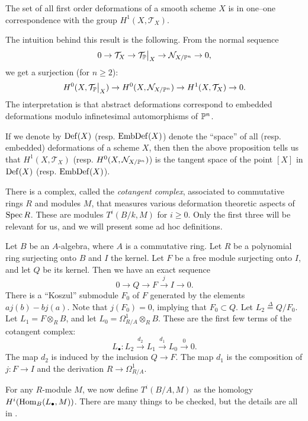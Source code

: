 \begin{proposition}
The set of all first order deformations of a smooth scheme $X$ is in one--one correspondence with the group $H^1(X,\mathcal T_X)$.
\end{proposition}

\begin{remark}
The intuition behind this result is the following. From the normal sequence
\[
0 \to \mathcal T_X \to \restr{\mathcal T_\P}{X} \to \mathcal N_{X/\P^n} \to 0,
\]
we get a surjection (for $n \geq 2$):
\[
H^0(X, \restr{\mathcal T_\P}{X}) \to H^0(X,\mathcal N_{X/\P^n}) \to H^1(X,\mathcal T_X) \to 0.
\]
The interpretation is that abstract deformations correspond to embedded deformations modulo infinetesimal automorphisms of $\P^n$.
\end{remark}

If we denote by $\Def(X)$  (resp. $\EmbDef(X)$) denote the ``space'' of all (resp. embedded) deformations of a scheme $X$, then then the above proposition tells us that $H^1(X,\mathcal T_X)$ (resp. $H^0(X,\mathcal N_{X/\P^n})$) is the tangent space of the point $[X]$ in $\Def(X)$ (resp. $\EmbDef(X)$).

There is a complex, called the \emph{cotangent complex}, associated to commutative rings $R$ and modules $M$, that measures various deformation theoretic aspects of $\Spec R$. These are modules $T^i(B/k,M)$ for $i \geq 0$. Only the first three will be relevant for us, and we will present some ad hoc definitions.

Let $B$ be an $A$-algebra, where $A$ is a commutative ring. Let $R$ be a polynomial ring surjecting onto $B$ and $I$ the kernel. Let $F$ be a free module surjecting onto $I$, and let $Q$ be its kernel. Then we have an exact sequence
\[
0 \to Q \to F \xrightarrow{j} I \to 0.
\]
There is a ``Koszul'' submodule $F_0$ of $F$ generated by the elements $aj(b)-bj(a)$. Note that $j(F_0)=0$, implying that $F_0 \subset Q$. Let $L_2 \stackrel \Delta = Q/F_0$. Let $L_1 = F \otimes_R B$, and let $L_0 = \Omega_{R/A}^1 \otimes_R B$. These are the first few terms of the cotangent complex:
\[
L_\bullet: L_2 \xrightarrow{d_2} L_1 \xrightarrow{d_1}  L_0 \xrightarrow{0} 0.
\]
The map $d_2$ is induced by the inclusion $Q \to F$. The map $d_1$ is the composition of $j:F \to I$ and the derivation $R \to \Omega^1_{R/A}$.

For any $R$-module $M$, we now define $T^i(B/A,M)$ as the homology $H^i(\Hom_B(L_\bullet,M))$. There are many things to be checked, but the details are all in \cite{hartshorne_deformations}.

